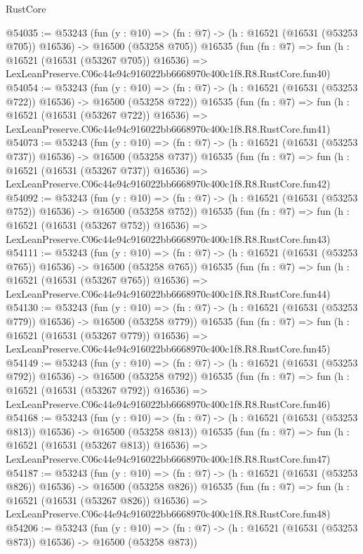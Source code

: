 \begin{lexlean}{RustCore}
\begin{coremodule}
@54035 := @53243
    (fun (y : @10) =>
    (fn : @7) -> (h : @16521 (@16531 (@53253 @705)) @16536) -> @16500 (@53258 @705))
    @16535
    (fun (fn : @7) =>
    fun (h : @16521 (@16531 (@53267 @705)) @16536) =>
    LexLeanPreserve.C06c44e94c916022bb6668970c400c1f8.R8.RustCore.fun40)
@54054 := @53243
    (fun (y : @10) =>
    (fn : @7) -> (h : @16521 (@16531 (@53253 @722)) @16536) -> @16500 (@53258 @722))
    @16535
    (fun (fn : @7) =>
    fun (h : @16521 (@16531 (@53267 @722)) @16536) =>
    LexLeanPreserve.C06c44e94c916022bb6668970c400c1f8.R8.RustCore.fun41)
@54073 := @53243
    (fun (y : @10) =>
    (fn : @7) -> (h : @16521 (@16531 (@53253 @737)) @16536) -> @16500 (@53258 @737))
    @16535
    (fun (fn : @7) =>
    fun (h : @16521 (@16531 (@53267 @737)) @16536) =>
    LexLeanPreserve.C06c44e94c916022bb6668970c400c1f8.R8.RustCore.fun42)
@54092 := @53243
    (fun (y : @10) =>
    (fn : @7) -> (h : @16521 (@16531 (@53253 @752)) @16536) -> @16500 (@53258 @752))
    @16535
    (fun (fn : @7) =>
    fun (h : @16521 (@16531 (@53267 @752)) @16536) =>
    LexLeanPreserve.C06c44e94c916022bb6668970c400c1f8.R8.RustCore.fun43)
@54111 := @53243
    (fun (y : @10) =>
    (fn : @7) -> (h : @16521 (@16531 (@53253 @765)) @16536) -> @16500 (@53258 @765))
    @16535
    (fun (fn : @7) =>
    fun (h : @16521 (@16531 (@53267 @765)) @16536) =>
    LexLeanPreserve.C06c44e94c916022bb6668970c400c1f8.R8.RustCore.fun44)
@54130 := @53243
    (fun (y : @10) =>
    (fn : @7) -> (h : @16521 (@16531 (@53253 @779)) @16536) -> @16500 (@53258 @779))
    @16535
    (fun (fn : @7) =>
    fun (h : @16521 (@16531 (@53267 @779)) @16536) =>
    LexLeanPreserve.C06c44e94c916022bb6668970c400c1f8.R8.RustCore.fun45)
@54149 := @53243
    (fun (y : @10) =>
    (fn : @7) -> (h : @16521 (@16531 (@53253 @792)) @16536) -> @16500 (@53258 @792))
    @16535
    (fun (fn : @7) =>
    fun (h : @16521 (@16531 (@53267 @792)) @16536) =>
    LexLeanPreserve.C06c44e94c916022bb6668970c400c1f8.R8.RustCore.fun46)
@54168 := @53243
    (fun (y : @10) =>
    (fn : @7) -> (h : @16521 (@16531 (@53253 @813)) @16536) -> @16500 (@53258 @813))
    @16535
    (fun (fn : @7) =>
    fun (h : @16521 (@16531 (@53267 @813)) @16536) =>
    LexLeanPreserve.C06c44e94c916022bb6668970c400c1f8.R8.RustCore.fun47)
@54187 := @53243
    (fun (y : @10) =>
    (fn : @7) -> (h : @16521 (@16531 (@53253 @826)) @16536) -> @16500 (@53258 @826))
    @16535
    (fun (fn : @7) =>
    fun (h : @16521 (@16531 (@53267 @826)) @16536) =>
    LexLeanPreserve.C06c44e94c916022bb6668970c400c1f8.R8.RustCore.fun48)
@54206 := @53243
    (fun (y : @10) =>
    (fn : @7) -> (h : @16521 (@16531 (@53253 @873)) @16536) -> @16500 (@53258 @873))

\end{coremodule}
\end{lexlean}
